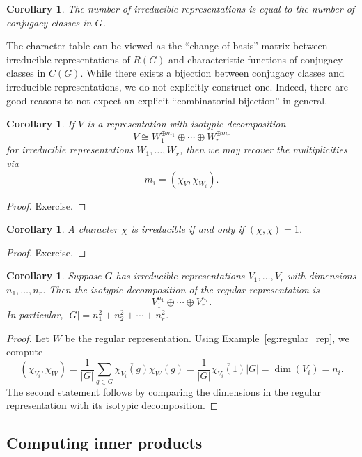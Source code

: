 \documentclass[12pt]{article}
\theoremstyle{plain}
\newtheorem{corollary}[theorem]{Corollary}
\theoremstyle{definition}
\theoremstyle{remark}
\numberwithin{equation}{section}
\begin{document}
\begin{corollary}
The number of irreducible representations is equal to the number of
conjugacy classes in $G$.
\end{corollary}

The character table can be viewed as the ``change of basis'' matrix
between irreducible representations of $R(G)$ and characteristic
functions of conjugacy classes in $C(G)$.
While there exists a bijection between conjugacy classes
and irreducible representations, we do not explicitly construct one.
Indeed, there are good reasons to not expect an explicit ``combinatorial
bijection'' in general. 

\begin{corollary}
If $V$ is a representation with isotypic decomposition
\[
V \cong W_1^{\oplus m_1} \oplus \cdots \oplus W_r^{\oplus m_r}
\]
for irreducible representations $W_1, \ldots, W_r$,
then we may recover the multiplicities via
\[
m_i = \left( \chi_V, \chi_{W_i} \right).
\]
\end{corollary}

\begin{proof}
Exercise.
\end{proof}

\begin{corollary}
A character $\chi$ is irreducible if and only if $(\chi,\chi)=1$.
\end{corollary}

\begin{proof}
Exercise.
\end{proof}

\begin{corollary}
Suppose $G$ has irreducible representations $V_1,\ldots,V_r$
with dimensions $n_1,\ldots, n_r$.  Then the isotypic decomposition of
the regular representation is
\[
V_1^{n_1} \oplus \cdots \oplus V_r^{n_r} .
\]
In particular, $|G|=n_1^2 + n_2^2 + \cdots + n_r^2$.
\end{corollary}

\begin{proof}
Let $W$ be the regular representation.
Using Example~\ref{eg:regular_rep}, we compute
\[
( \chi_{V_i} , \chi_W ) = \frac{1}{|G|}
\sum_{g \in G} \overline{\chi_{V_i}(g)} \chi_W(g)
= \frac{1}{|G|} \overline{\chi_{V_i}(1)} |G|
= \dim(V_i)=n_i.
\]
The second statement follows by comparing the dimensions
in the regular representation with its isotypic decomposition.
\end{proof}

\subsection{Computing inner products}
\end{document}
